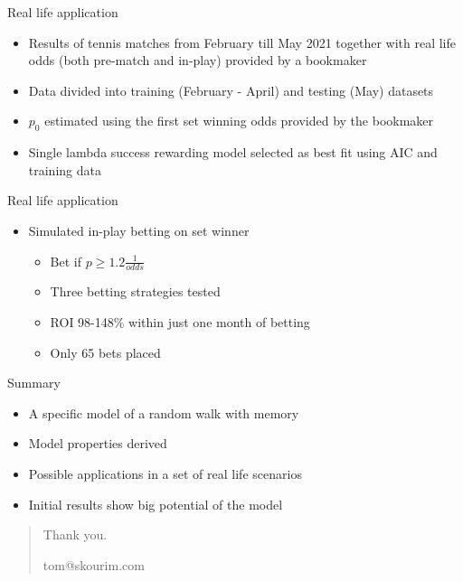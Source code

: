 \documentclass[american]{beamer}
\begin{document}
    \begin{frame}{Real life application}
        \begin{itemize}
            \item Results of tennis matches from February till May 2021 together with real life odds (both pre-match and in-play) provided by a bookmaker
	        \item Data divided into training (February - April) and testing (May) datasets
            \item $p_{0}$ estimated using the first set winning odds provided by the bookmaker
            \item Single lambda success rewarding model selected as best fit using AIC and training data
        \end{itemize}
    \end{frame}

    \begin{frame}{Real life application}
        \begin{itemize}
            \item Simulated in-play betting on set winner
            \begin{itemize}
                \item<2-> Bet if $p\geq {1.2}\frac{1}{odds}$
                \item<3-> Three betting strategies tested
                \item<4-> ROI 98-148\% within just one month of betting
                \item<5-> Only 65 bets placed
            \end{itemize}
        \end{itemize}
    \end{frame}

    \begin{frame}{Summary}
        \begin{itemize}
            \item A specific model of a random walk with memory
            \item Model properties derived
            \item Possible applications in a set of real life scenarios
            \item Initial results show big potential of the model
        \end{itemize}
    \end{frame}

    \begin{frame}[plain]
        \begin{quote}
            \begin{center}
                \huge{Thank you.}
            \end{center}
            \vspace{10mm}
            \begin{center}
                \large{tom@skourim.com}
            \end{center}
        \end{quote}
    \end{frame}
\end{document}
